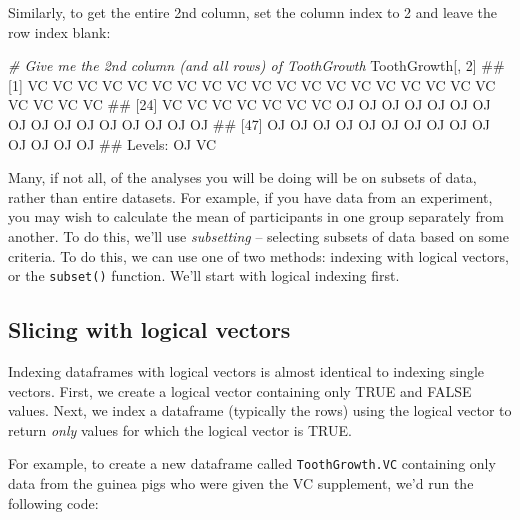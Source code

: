 \documentclass[]{book}
\newenvironment{Shaded}{\begin{snugshade}}{\end{snugshade}}
\newcommand{\DecValTok}[1]{\textcolor[rgb]{0.00,0.00,0.81}{#1}}
\newcommand{\StringTok}[1]{\textcolor[rgb]{0.31,0.60,0.02}{#1}}
\newcommand{\CommentTok}[1]{\textcolor[rgb]{0.56,0.35,0.01}{\textit{#1}}}
\newcommand{\OperatorTok}[1]{\textcolor[rgb]{0.81,0.36,0.00}{\textbf{#1}}}
\newcommand{\NormalTok}[1]{#1}
\theoremstyle{definition}
\theoremstyle{definition}
\theoremstyle{remark}
\begin{document}
Similarly, to get the entire 2nd column, set the column index to 2 and
leave the row index blank:

\begin{Shaded}
\begin{Highlighting}[]
\CommentTok{# Give me the 2nd column (and all rows) of ToothGrowth}
\NormalTok{ToothGrowth[, }\DecValTok{2}\NormalTok{]}
\NormalTok{##  [1] VC VC VC VC VC VC VC VC VC VC VC VC VC VC VC VC VC VC VC VC VC VC VC}
\NormalTok{## [24] VC VC VC VC VC VC VC OJ OJ OJ OJ OJ OJ OJ OJ OJ OJ OJ OJ OJ OJ OJ OJ}
\NormalTok{## [47] OJ OJ OJ OJ OJ OJ OJ OJ OJ OJ OJ OJ OJ OJ}
\NormalTok{## Levels: OJ VC}
\end{Highlighting}
\end{Shaded}

Many, if not all, of the analyses you will be doing will be on subsets
of data, rather than entire datasets. For example, if you have data from
an experiment, you may wish to calculate the mean of participants in one
group separately from another. To do this, we'll use \emph{subsetting}
-- selecting subsets of data based on some criteria. To do this, we can
use one of two methods: indexing with logical vectors, or the
\texttt{subset()} function. We'll start with logical indexing first.

\subsection{Slicing with logical
vectors}\label{slicing-with-logical-vectors}

Indexing dataframes with logical vectors is almost identical to indexing
single vectors. First, we create a logical vector containing only TRUE
and FALSE values. Next, we index a dataframe (typically the rows) using
the logical vector to return \emph{only} values for which the logical
vector is TRUE.

For example, to create a new dataframe called \texttt{ToothGrowth.VC}
containing only data from the guinea pigs who were given the VC
supplement, we'd run the following code:

\begin{Shaded}
\end{Shaded}
\end{document}
